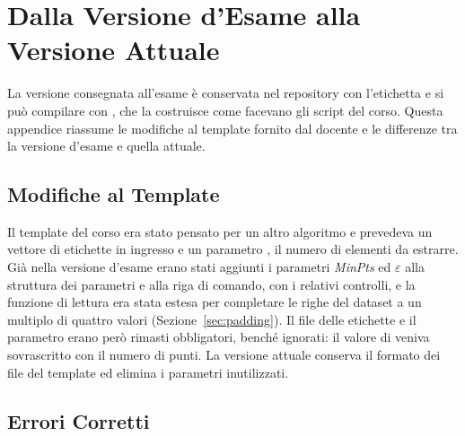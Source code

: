 \chapter{Dalla Versione d'Esame alla Versione Attuale}
\label{app:modifiche}

La versione consegnata all'esame è conservata nel repository con l'etichetta  e si può compilare con , che la costruisce come facevano gli script del corso. Questa appendice riassume le modifiche al template fornito dal docente e le differenze tra la versione d'esame e quella attuale.

\section{Modifiche al Template}

Il template del corso era stato pensato per un altro algoritmo e prevedeva un vettore di etichette in ingresso e un parametro , il numero di elementi da estrarre. Già nella versione d'esame erano stati aggiunti i parametri \textit{MinPts} ed $\varepsilon$ alla struttura dei parametri e alla riga di comando, con i relativi controlli, e la funzione di lettura era stata estesa per completare le righe del dataset a un multiplo di quattro valori (Sezione~\ref{sec:padding}). Il file delle etichette e il parametro  erano però rimasti obbligatori, benché ignorati: il valore di  veniva sovrascritto con il numero di punti. La versione attuale conserva il formato dei file del template ed elimina i parametri inutilizzati.

\section{Errori Corretti}

